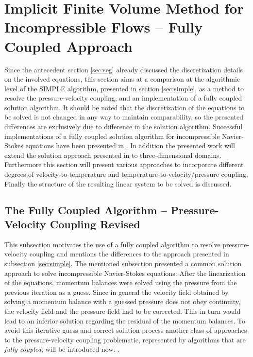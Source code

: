 \section{Implicit Finite Volume Method for Incompressible Flows -- Fully Coupled Approach}
\label{sec:cpld}

Since the antecedent section \ref{sec:seg} already discussed the discretization details on the involved equations, this section aims at a comparison at the algorithmic level of the SIMPLE algorithm, presented in section \ref{sec:simple}, as a method to resolve the pressure-velocity coupling, and an implementation of a fully coupled solution algorithm. It should be noted that the discretization of the equations to be solved is not changed in any way to maintain comparability, so the presented differences are exclusively due to difference in the solution algorithm. Successful implementations of a fully coupled solution algorithm for incompressible Navier-Stokes equations have been presented in \cite{chen10,darwish09,falk13,vakilipour12}. In addition the presented work will extend the solution approach presented in \cite{falk13} to three-dimensional domains. Furthermore this section will present various approaches to incorporate different degrees of velocity-to-temperature and temperature-to-velocity/pressure coupling. Finally the structure of the resulting linear system to be solved is discussed.

\subsection{The Fully Coupled Algorithm -- Pressure-Velocity Coupling Revised}

This subsection motivates the use of a fully coupled algorithm to resolve pressure-velocity coupling and mentions the differences to the approach presented in subsection \ref{sec:simple}. The mentioned subsection presented a common solution approach to solve incompressible Navier-Stokes equations: After the linearization of the equations, momentum balances were solved using the pressure from the previous iteration as a guess. Since in general the velocity field obtained by solving a momentum balance with a guessed pressure does not obey continuity, the velocity field and the pressure field had to be corrected. This in turn would lead to an inferior solution regarding the residual of the momentum balances. To avoid this iterative guess-and-correct solution process another class of approaches to the pressure-velocity coupling problematic, represented by algorithms that are \emph{fully coupled}, will be introduced now. . 


